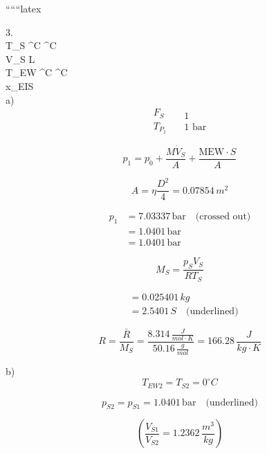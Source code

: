 
``````latex


3.   \\
T_S ^\circ C ^\circ C \\
V_S  L \\
T_{EW} ^\circ C ^\circ C \\
x_{EIS}  \\

a) \\
\[
\begin{array}{c}
F_S \\
\hline
T_{P_1}
\end{array}
\quad
\begin{array}{c}
1 \\
\hline
1 \text{ bar}
\end{array}
\]

\[
p_1 = p_0 + \frac{M \dot{V}_S}{A} + \frac{\text{MEW} \cdot S}{A}
\]

\[
A = \eta \frac{D^2}{4} = 0.07854 \, m^2
\]

\[
\begin{aligned}
p_1 &= 7.03337 \, \text{bar} \quad \text{(crossed out)} \\
&= 1.0401 \, \text{bar} \\
&= 1.0401 \, \text{bar}
\end{aligned}
\]

\[
M_S = \frac{p_S V_S}{R T_S}
\]

\[
\begin{aligned}
&= 0.025401 \, kg \\
&= 2.5401 \, S \quad \text{(underlined)}
\end{aligned}
\]

\[
R = \frac{\bar{R}}{M_S} = \frac{8.314 \, \frac{J}{mol \cdot K}}{50.16 \, \frac{g}{mol}} = 166.28 \, \frac{J}{kg \cdot K}
\]

b) \\
\[
T_{EW2} = T_{S2} = 0^\circ C
\]


\[
p_{S2} = p_{S1} = 1.0401 \, \text{bar} \quad \text{(underlined)}
\]

\textcolor{red}{}

\[
\left( \frac{V_{S1}}{V_{S2}} = 1.2362 \, \frac{m^3}{kg} \right)
\]

\textcolor{red}{}

